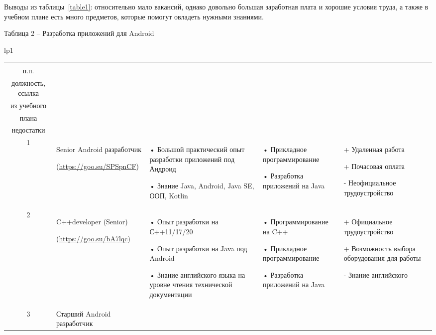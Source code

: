 \documentclass[14pt]{extreport}
\begin{document}
\begin{landscape}
Выводы из таблицы~\ref{table1}: относительно мало вакансий, однако довольно большая заработная плата и хорошие условия труда, а также в учебном плане есть много предметов, которые помогут овладеть нужными знаниями.




\newpage
Таблица 2 – Разработка приложений для Android
\begin{longtable}[H]{lp{1\linewidth}}

\caption{Разработка приложений для  \label{table2}}


\centering

\begin{small}


    \begin{tabular}{|c|p{}|p{6cm}|p{5cm}|p{5cm}|}
	\hline 
	\makecell{№ \\ п.п.} &	\makecell{Наименование,\\ должность, ссылка} &	\makecell{Требования} & 	\makecell{Дисциплины \\ из учебного \\плана} &	\makecell{Преимущества и \\недостатки}  \\ 
	\hline 
	1	& Senior Android разработчик
	
(\url{https://goo.su/SPSpnCF}) &
•	Большой практический опыт разработки приложений под Андроид

•	Знание Java, Android, Java SE, ООП, Kotlin &
•	Прикладное программирование

•	Разработка приложений на Java &
+	Удаленная работа


+	Почасовая оплата

-	Неофициальное трудоустройство \\

	\hline
	2	& C++developer (Senior)
	
(\url{https://goo.su/bA7lqc}) &
•	Опыт разработки на С++11/17/20

•	Опыт разработки на Java под Android 

•	Знание английского языка на уровне чтения технической документации &
•	Программирование на C++

•	Прикладное программирование

•	Разработка приложений на Java &
+	Официальное трудоустройство 

+	Возможность выбора оборудования для работы

-	Знание английского\\
	\hline 
	3	& Старший Android разработчик 
	

\end{tabular}
\end{small}
\end{longtable}
\end{landscape}
\end{document}
